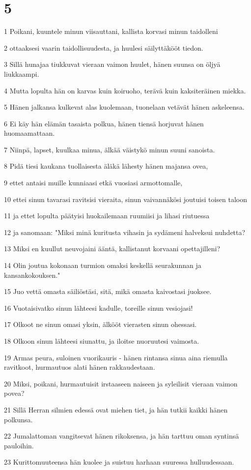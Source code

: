 \chapter{5}

\par 1 Poikani, kuuntele minun viisauttani, kallista korvasi minun taidolleni
\par 2 ottaaksesi vaarin taidollisuudesta, ja huulesi säilyttäkööt tiedon.
\par 3 Sillä hunajaa tiukkuvat vieraan vaimon huulet, hänen suunsa on öljyä liukkaampi.
\par 4 Mutta lopulta hän on karvas kuin koiruoho, terävä kuin kaksiteräinen miekka.
\par 5 Hänen jalkansa kulkevat alas kuolemaan, tuonelaan vetävät hänen askeleensa.
\par 6 Ei käy hän elämän tasaista polkua, hänen tiensä horjuvat hänen huomaamattaan.
\par 7 Niinpä, lapset, kuulkaa minua, älkää väistykö minun suuni sanoista.
\par 8 Pidä tiesi kaukana tuollaisesta äläkä lähesty hänen majansa ovea,
\par 9 ettet antaisi muille kunniaasi etkä vuosiasi armottomalle,
\par 10 ettei sinun tavarasi ravitsisi vieraita, sinun vaivannäkösi joutuisi toisen taloon
\par 11 ja ettet lopulta päätyisi huokailemaan ruumiisi ja lihasi riutuessa
\par 12 ja sanomaan: "Miksi minä kuritusta vihasin ja sydämeni halveksui nuhdetta?
\par 13 Miksi en kuullut neuvojaini ääntä, kallistanut korvaani opettajilleni?
\par 14 Olin joutua kokonaan turmion omaksi keskellä seurakunnan ja kansankokouksen."
\par 15 Juo vettä omasta säiliöstäsi, sitä, mikä omasta kaivostasi juoksee.
\par 16 Vuotaisivatko sinun lähteesi kadulle, toreille sinun vesiojasi!
\par 17 Olkoot ne sinun omasi yksin, älkööt vierasten sinun ohessasi.
\par 18 Olkoon sinun lähteesi siunattu, ja iloitse nuoruutesi vaimosta.
\par 19 Armas peura, suloinen vuorikauris - hänen rintansa sinua aina riemulla ravitkoot, hurmautuos alati hänen rakkaudestaan.
\par 20 Miksi, poikani, hurmautuisit irstaaseen naiseen ja syleilisit vieraan vaimon povea?
\par 21 Sillä Herran silmien edessä ovat miehen tiet, ja hän tutkii kaikki hänen polkunsa.
\par 22 Jumalattoman vangitsevat hänen rikoksensa, ja hän tarttuu oman syntinsä pauloihin.
\par 23 Kurittomuuteensa hän kuolee ja suistuu harhaan suuressa hulluudessaan.

